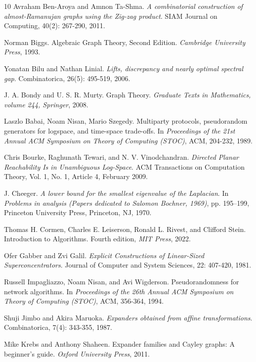 \documentclass{article}
\begin{document}
\begin{thebibliography}{10}
{\sc Avraham Ben-Aroya and Amnon Ta-Shma}. {\em A combinatorial construction of almost-Ramanujan graphs using the Zig-zag product}. SIAM Journal on Computing, 40(2): 267-290, 2011.

{\sc Norman Biggs}. {Algebraic Graph Theory}, Second Edition. {\em Cambridge University Press}, 1993.

{\sc Yonatan Bilu and Nathan Linial}. {\em Lifts, discrepancy and nearly optimal spectral gap}. Combinatorica, 26(5): 495-519, 2006.

{\sc J. A. Bondy and U. S. R. Murty}. {Graph Theory}. {\em Graduate Texts in Mathematics, volume 244, Springer}, 2008.

{\sc Laszlo Babai, Noam Nisan, Mario Szegedy}. {Multiparty protocols, pseudorandom generators for logspace, and time-space trade-offs}. In {\em Proceedings of the 21st Annual ACM Symposium on Theory of Computing (STOC)}, ACM, 204-232, 1989.

{\sc Chris Bourke, Raghunath Tewari, and N. V. Vinodchandran}. {\em Directed Planar Reachability Is in Unambiguous Log-Space}. ACM Transactions on Computation Theory, Vol. 1, No. 1, Article 4, February 2009.

{\sc J. Cheeger}. {\em A lower bound for the smallest eigenvalue of the Laplacian}. In {\em Problems in analysis (Papers dedicated to Salomon Bochner, 1969)}, pp. 195–199, Princeton University Press, Princeton, NJ, 1970.

{\sc Thomas H. Cormen, Charles E. Leiserson, Ronald L. Rivest, and Clifford Stein}. {Introduction to Algorithms}. Fourth edition, {\em MIT Press}, 2022.

{\sc Ofer Gabber and Zvi Galil}. {\em Explicit Constructions of Linear-Sized Superconcentrators}. Journal of Computer and System Sciences,  22: 407-420, 1981.

{\sc Russell Impagliazzo, Noam Nisan, and Avi Wigderson}. {Pseudorandomness for network algorithms}. In {\em Proceedings of the 26th Annual ACM Symposium on Theory of Computing (STOC)}, ACM, 356-364, 1994.

{\sc Shuji Jimbo and Akira Maruoka}. {\em Expanders obtained from affine transformations}. Combinatorica, 7(4): 343-355, 1987.

{\sc Mike Krebs and Anthony Shaheen}. {Expander families and Cayley graphs: A beginner's guide}. {\em Oxford University Press}, 2011.


\end{thebibliography}
\end{document}
